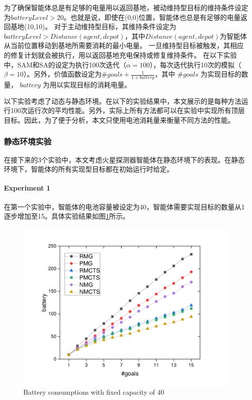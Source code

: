 %
为了确保智能体总是有足够的电量用以返回基地，被动维持型目标的维持条件设定为$batteryLevel > 20$。也就是说，即使在(0,0)位置，智能体也总是有足够的电量返回基地(10,10)。
%
对于主动维持型目标，其维持条件设定为$batteryLevel > Distance(agent, depot)$，其中$Distance(agent, depot)$为智能体从当前位置移动到基地所需要消耗的最小电量。
%
一旦维持型目标被触发，其相应的修复计划就会被执行，用以返回基地充电保持或修复维持条件。
%
在以下实验中，SAM和SA的设定为执行100次迭代（$\alpha = 100$），每次迭代执行10次的模拟（$\beta = 10$）。另外，价值函数设定为$\#goals + \frac{1}{1 + {battery}}$，其中 $\#goals$ 为实现目标的数量， $battery$ 为用以实现目标的消耗电量。

以下实验考虑了动态与静态环境。在以下的实验结果中，本文展示的是每种方法运行100次运行次的平均性能。另外，实际上所有方法都可以在实验中实现所有顶层目标。因此，为了便于分析，本文只使用电池消耗量来衡量不同方法的性能。
\subsubsection{静态环境实验}
在接下来的3个实验中，本文考虑火星探测器智能体在静态环境下的表现。在静态环境下，智能体的所有实现型目标都在初始运行时给定。
\paragraph{Experiment 1}
在第一个实验中，智能体的电池容量被设定为40，智能体需要实现目标的数量从1逐步增加至15。具体实验结果如图\ref{fig:static1}所示。
\begin{figure}[!h]
\centering
\includegraphics[scale=0.4]{./figs/gX_cY_fixCap40.pdf}
\captionsetup{justification=centering}
\caption{Battery consumptions with fixed capacity of 40}
\label{fig:static1}
\end{figure}

